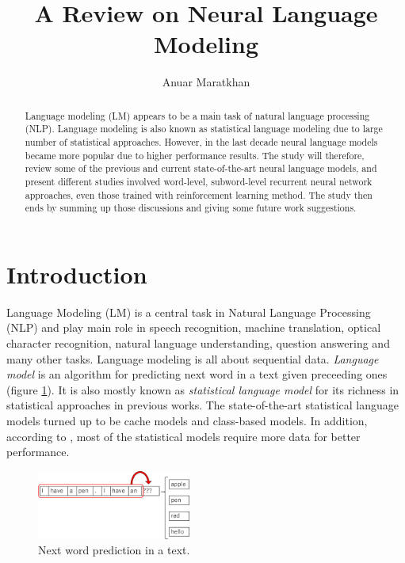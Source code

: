 \documentclass{IEEEtran}
\title{A Review on Neural Language Modeling}
\author{Anuar Maratkhan}
\affil{School of Science and Technology\\Nazarbayev University\\anuar.maratkhan@nu.edu.kz}
\begin{document}
\maketitle

\begin{abstract}
Language modeling (LM) appears to be a main task of natural language processing (NLP). Language modeling is also known as statistical language modeling due to large number of statistical approaches. However, in the last decade neural language models became more popular due to higher performance results. The study will therefore, review some of the previous and current state-of-the-art neural language models, and present different studies involved word-level, subword-level recurrent neural network approaches, even those trained with reinforcement learning method. The study then ends by summing up those discussions and giving some future work suggestions.
\end{abstract}

\section{Introduction}

Language Modeling (LM) is a central task in Natural Language Processing (NLP) and play main role in speech recognition, machine translation, optical character recognition, natural language understanding, question answering and many other tasks. Language modeling is all about sequential data. \textit{Language model} is an algorithm for predicting next word in a text given preceeding ones (figure \ref{fig:sequence}). It is also mostly known as \textit{statistical language model} for its richness in statistical approaches in previous works. The state-of-the-art statistical language models turned up to be cache models and class-based models. In addition, according to \cite{Mikolov2010NeuralLM}, most of the statistical models require more data for better performance. 

\begin{figure}[h]
	\centering
	\includegraphics[width=0.45\textwidth]{sequence}
	\caption{Next word prediction in a text.}
	\label{fig:sequence}
\end{figure}
\end{document}
